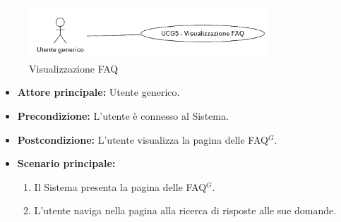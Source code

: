 \newpage
{}

\label{usecase:Visualizzazione FAQ}

\begin{figure}[h]
	\centering
	\includegraphics[width=0.8\textwidth]{./uml/UCG5.png} 
	\caption{Visualizzazione FAQ}
	\label{fig:UCG5}
  \end{figure}

\begin{itemize}
	\item \textbf{Attore principale:} Utente generico.


	\item \textbf{Precondizione:}
	      L'utente è connesso al Sistema.

	\item \textbf{Postcondizione:} L'utente visualizza la pagina delle \ac{FAQ}$^G$.

	\item \textbf{Scenario principale:}
	      \begin{enumerate}
              \item Il Sistema presenta la pagina delle \ac{FAQ}$^G$.
              \item L'utente naviga nella pagina alla ricerca di risposte alle sue domande.
		    
	      \end{enumerate}
\end{itemize}
